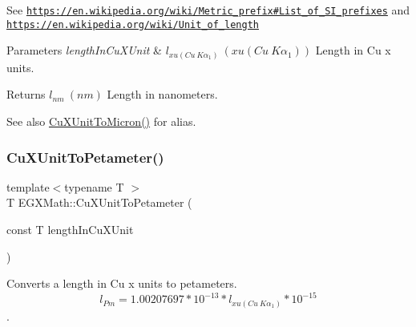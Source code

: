 See \href{https://en.wikipedia.org/wiki/Metric_prefix#List_of_SI_prefixes}{\tt https\+://en.\+wikipedia.\+org/wiki/\+Metric\+\_\+prefix\#\+List\+\_\+of\+\_\+\+S\+I\+\_\+prefixes} and \href{https://en.wikipedia.org/wiki/Unit_of_length}{\tt https\+://en.\+wikipedia.\+org/wiki/\+Unit\+\_\+of\+\_\+length} 
\begin{DoxyParams}{Parameters}
{\em length\+In\+Cu\+X\+Unit} & $ l_{xu(Cu\ K\alpha_1)}\ (xu(Cu\ K\alpha_1))$ Length in Cu x units. \\
\hline
\end{DoxyParams}
\begin{DoxyReturn}{Returns}
$ l_{nm}\ (nm)$ Length in nanometers. 
\end{DoxyReturn}
\begin{DoxySeeAlso}{See also}
\mbox{\hyperlink{group___e_g_x_math-_conversions-_length_conversions-_non-_s_i-_cu_x_unit-_non-_s_i_ga382a9cae8bb23cf8d54777f5ccbff90b}{Cu\+X\+Unit\+To\+Micron()}} for alias. 
\end{DoxySeeAlso}
\mbox{\label{group___e_g_x_math-_conversions-_length_conversions-_non-_s_i-_cu_x_unit-_s_i_ga9e2e713fd8dc5117201b916333d61b76}} 
\subsubsection{\texorpdfstring{Cu\+X\+Unit\+To\+Petameter()}{CuXUnitToPetameter()}}
{\footnotesize\ttfamily template$<$typename T $>$ \\
T E\+G\+X\+Math\+::\+Cu\+X\+Unit\+To\+Petameter (\begin{DoxyParamCaption}\item[{const T}]{length\+In\+Cu\+X\+Unit }\end{DoxyParamCaption})}



Converts a length in Cu x units to petameters. \[ l_{Pm}=1.00207697*10^{-13} * l_{xu(Cu\ K\alpha_1)} * 10^{-15} \]. 

